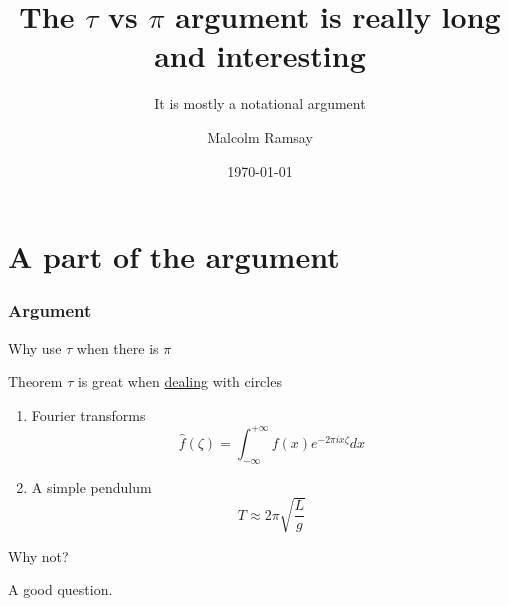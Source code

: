 \documentclass[aspectratio=169, 22pt]{beamer}
\title{The $\tau$ vs $\pi$ argument is really long and interesting}
\subtitle{It is mostly a notational argument}
\date{\today}
\author[Malcolm]{Malcolm Ramsay}
\begin{document}
\titleslide

\part{A part of the argument}
\partslide

\section{Argument}

\begin{plain}{Why use $\tau$ when there is $\pi$}
  \begin{block}{Theorem}
    $\tau$ is great when \href{http://blah}{dealing} with circles
  \end{block}

  \begin{enumerate}
    \item<1-> Fourier transforms
      \begin{equation}
        \hat f(\zeta) = \int_{-\infty}^{+\infty} f(x) e^{-2\pi ix\zeta} dx
      \end{equation}
    \item<2-> A simple pendulum
      \begin{equation}
        T \approx 2\pi \sqrt{\frac{L}{g}}
      \end{equation}
  \end{enumerate}
\end{plain}

\begin{points}{Why not?}
  \item A good question.
\end{points}
\end{document}
